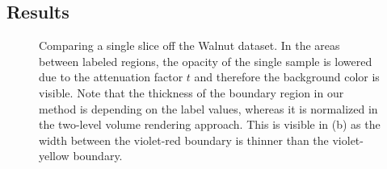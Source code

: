 \documentclass{egpubl}
\begin{document}
\subsection{Results}

\begin{figure}
	\centering
	\caption{Comparing a single slice off the Walnut dataset. In the areas between labeled regions, the opacity of the single sample is lowered due to the attenuation factor $t$ and therefore the background color is visible. Note that the thickness of the boundary region in our method is depending on the label values, whereas it is normalized in the two-level volume rendering approach. This is visible in (b) as the width between the violet-red boundary is thinner than the violet-yellow boundary.}
	\label{fig:result:single}
\end{figure}
\end{document}
